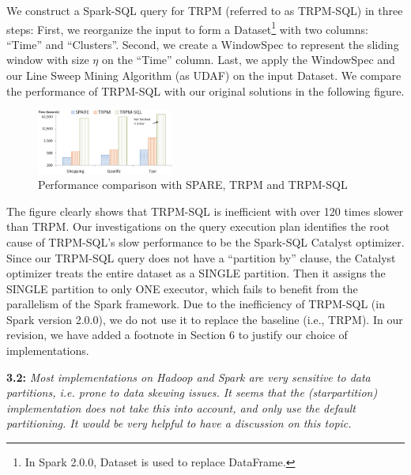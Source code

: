\documentclass{vldb}
\begin{document}
We construct a Spark-SQL query for TRPM (referred to as TRPM-SQL) in three steps:
First, we reorganize the input to form a Dataset\footnote{In Spark 2.0.0, Dataset is used to replace DataFrame.} with two columns: ``Time'' and ``Clusters''. 
Second, we create a WindowSpec to represent the sliding window with size $\eta$ on the ``Time'' column.
Last, we apply the WindowSpec and our Line Sweep Mining Algorithm (as UDAF) on the input Dataset.
We compare the performance of TRPM-SQL with our original solutions in the following figure.
%

\begin{figure}[h]
\centering
\includegraphics[width=0.4\textwidth]{spark-sql-comp.eps}
\caption{Performance comparison with SPARE, TRPM and TRPM-SQL}
\end{figure}

The figure clearly shows that TRPM-SQL is inefficient with over
120 times slower than TRPM. Our investigations on the query execution
plan identifies the root cause of  TRPM-SQL's slow performance to be the Spark-SQL Catalyst optimizer.
Since our TRPM-SQL query does not have a ``partition by'' clause, the Catalyst optimizer
treats the entire dataset as a SINGLE partition. Then it assigns the SINGLE partition to only ONE executor,
which fails to benefit from the parallelism of the Spark framework. 
Due to the inefficiency of TRPM-SQL (in Spark version 2.0.0), 
we do not use it to replace the baseline (i.e., TRPM). 
In our revision, we have added a footnote in Section 6 to justify our choice of implementations.



\textbf{3.2:} \emph{Most implementations
on Hadoop and Spark are very sensitive to data partitions, i.e. prone to data
skewing issues. It seems that the (starpartition)
implementation does not take
this into account, and only use the default partitioning. It would be very helpful
to have a discussion on this topic.}
\end{document}
